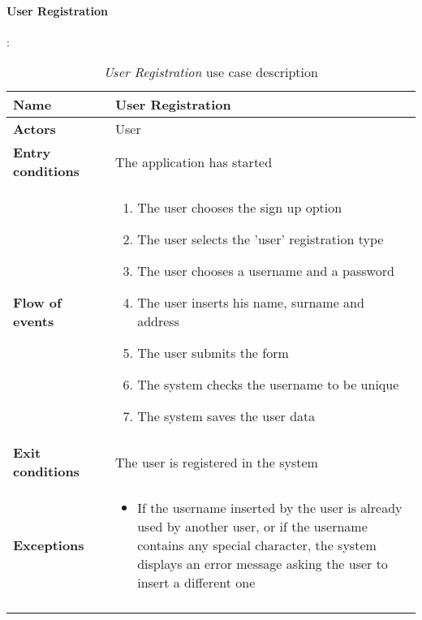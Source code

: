 		\paragraph{User Registration}
		:
		\begin{longtable}{p{0.25\linewidth}p{0.75\linewidth}}
			\toprule
			\textbf{Name} & \textbf{User Registration} \\
			\midrule
			\textbf{Actors} & User \\
			\midrule
			\textbf{Entry conditions} & The application has started \\
			\midrule
			\textbf{Flow of events} & 
			\begin{enumerate}
				\item The user chooses the sign up option
				\item The user selects the 'user' registration type
				\item The user chooses a username and a password
				\item The user inserts his name, surname and address
				\item The user submits the form
				\item The system checks the username to be unique
				\item The system saves the user data
			\end{enumerate} \\
			\midrule
			\textbf{Exit conditions} & The user is registered in the system\\
			\midrule
			\textbf{Exceptions} & 
			\begin{itemize}
				\item If the username inserted by the user is already used by another user, or if the username contains any special character, the system displays an error message asking the user to insert a different one
			\end{itemize} \\
			\bottomrule
			\caption{\emph{User Registration} use case description}
		\end{longtable}
	
